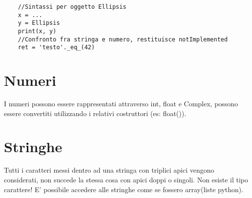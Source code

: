 \begin{lstlisting}
	//Sintassi per oggetto Ellipsis
	x = ...
	y = Ellipsis
	print(x, y)
	//Confronto fra stringa e numero, restituisce notImplemented
	ret = 'testo'._eq_(42)
\end{lstlisting}

\section{Numeri}

I numeri possono essere rappresentati attraverso int, float e Complex, possono essere convertiti utilizzando i relativi costruttori (es: float()).

\section{Stringhe}

Tutti i caratteri messi dentro ad una stringa con triplici apici vengono considerati, non succede la stessa cosa con apici doppi o singoli.
Non esiste il tipo carattere! E' possibile accedere alle stringhe come se fossero array(liste python).

\begin{listlisting}
	\item 
\end{listlisting}